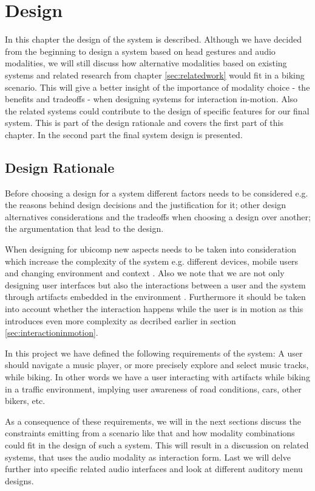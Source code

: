 \chapter{Design}
\label{sec:design}
In this chapter the design of the system is described. Although we have decided from the beginning to design a system based on head gestures and audio modalities, we will still discuss how alternative modalities based on existing systems and related research from chapter \ref{sec:relatedwork} would fit in a biking scenario. This will give a better insight of the importance of modality choice - the benefits and tradeoffs - when designing systems for interaction in-motion. Also the related systems could contribute to the design of specific features for our final system. This is part of the design rationale and covers the first part of this chapter. In the second part the final system design is presented.


\section{Design Rationale}
Before choosing a design for a system different factors needs to be considered e.g. the reasons behind design decisions and the justification for it; other design alternatives considerations and the tradeoffs when choosing a design over another; the argumentation that lead to the design.

When designing for ubicomp new aspects needs to be taken into consideration which increase the complexity of the system e.g. different devices, mobile users and changing environment and context \cite{barfield_fundamentals_2000}. Also we note that we are not only designing user interfaces but also the interactions between a user and the system through artifacts embedded in the environment \cite{beaudouin-lafon_designing_2004}. Furthermore it should be taken into account whether the interaction happens while the user is in motion as this introduces even more complexity as decribed earlier in section \ref{sec:interactioninmotion}.

In this project we have defined the following requirements of the system: A user should navigate a music player, or more precisely explore and select music tracks, while biking. In other words we have a user interacting with artifacts while biking in a traffic environment, implying user awareness of road conditions, cars, other bikers, etc.

As a consequence of these requirements, we will in the next sections discuss the constraints emitting from a scenario like that and how modality combinations could fit in the design of such a system. This will result in a discussion on related systems, that uses the audio modality as interaction form. Last we will delve further into specific related audio interfaces and look at different auditory menu designs.

